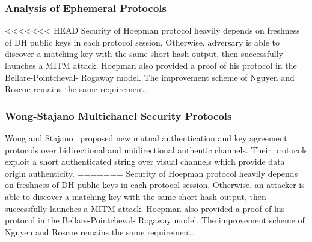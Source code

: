 \begin{center}
\end{center}

\subsubsection*{Analysis of Ephemeral Protocols}

<<<<<<< HEAD
Security of Hoepman protocol heavily depends on freshness of DH public keys in each protocol session. Otherwise, adversary is able to discover a matching key with the same short hash output, then successfully launches a MITM attack. Hoepman also provided a proof of his protocol in the Bellare-Pointcheval- Rogaway model. The improvement scheme of Nguyen and Roscoe remains the same requirement. 

\subsubsection{Wong-Stajano Multichanel Security Protocols}\label{WS}

Wong and Stajano~\cite{10.1109/MPRV.2007.76} proposed new mutual authentication and key agreement protocols over bidirectional and unidirectional authentic channels. Their protocols exploit a short authenticated string over visual channels which provide data origin authenticity. 
=======
Security of Hoepman protocol heavily depends on freshness of DH public keys in each protocol session. Otherwise, an attacker is able to discover a matching key with the same short hash output, then successfully launches a MITM attack. Hoepman also provided a proof of his protocol in the Bellare-Pointcheval- Rogaway model. The improvement scheme of Nguyen and Roscoe remains the same requirement. 

